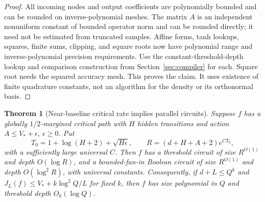 \documentclass[11pt]{article}
\newtheorem{theorem}{Theorem}[section]
\theoremstyle{remark}
\begin{document}
\begin{proof}
All incoming nodes and output coefficients are polynomially bounded
and can be rounded on inverse-polynomial meshes. The matrix $A$ is
an independent nonuniform constant of bounded operator norm and
can be rounded directly; it need not be estimated from truncated
samples. Affine forms, tanh lookups, squares, finite sums, clipping,
and square roots now have polynomial range and inverse-polynomial
precision requirements. Use the constant-threshold-depth lookup
and comparison construction from Section~\ref{sec:compiler} for
each. Square root needs the squared accuracy mesh. This proves the
claim. It uses existence of finite quadrature constants, not an
algorithm for the density or its orthonormal basis.
\end{proof}

\begin{theorem}[Near-baseline critical rate implies parallel circuits]
\label{thm:critical-normal-form}
Suppose $f$ has a globally $1/2$-margined critical path with $H$ hidden
transitions and action $A\le V_*+\epsilon$, $\epsilon\ge0$.
Put
\[
 T_0=1+\log(H+2)+\sqrt{H\epsilon},\qquad
 R=(d+H+A+2)e^{CT_0},
\]
with a sufficiently large universal $C$.
Then $f$ has a threshold circuit of size $R^{O(1)}$ and depth
$O(\log R)$, and a bounded-fan-in Boolean circuit of size $R^{O(1)}$
and depth $O(\log^2R)$, with universal constants.
Consequently, if $d+L\le Q^k$ and
$J_L(f)\le V_*+k\log^2Q/L$ for fixed $k$, then $f$ has size
polynomial in $Q$ and threshold depth $O_k(\log Q)$.
\end{theorem}
\end{document}
